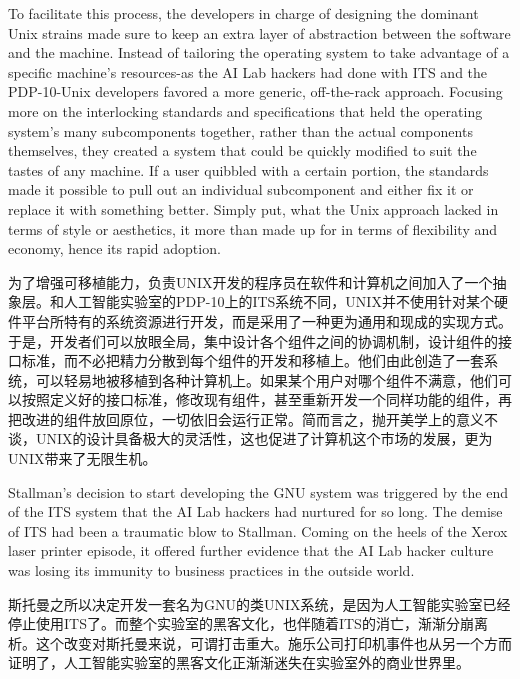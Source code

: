 \ifdefined\vone
\ifdefined\eng
To facilitate this process, the developers in charge of designing the dominant Unix strains made sure to keep an extra layer of abstraction between the software and the machine. Instead of tailoring the operating system to take advantage of a specific machine's resources-as the AI Lab hackers had done with ITS and the PDP-10-Unix developers favored a more generic, off-the-rack approach. Focusing more on the interlocking standards and specifications that held the operating system's many subcomponents together, rather than the actual components themselves, they created a system that could be quickly modified to suit the tastes of any machine. If a user quibbled with a certain portion, the standards made it possible to pull out an individual subcomponent and either fix it or replace it with something better. Simply put, what the Unix approach lacked in terms of style or aesthetics, it more than made up for in terms of flexibility and economy, hence its rapid adoption.
\fi

\ifdefined\chs
为了增强可移植能力，负责UNIX开发的程序员在软件和计算机之间加入了一个抽象层。和人工智能实验室的PDP-10上的ITS系统不同，UNIX并不使用针对某个硬件平台所特有的系统资源进行开发，而是采用了一种更为通用和现成的实现方式。于是，开发者们可以放眼全局，集中设计各个组件之间的协调机制，设计组件的接口标准，而不必把精力分散到每个组件的开发和移植上。他们由此创造了一套系统，可以轻易地被移植到各种计算机上。如果某个用户对哪个组件不满意，他们可以按照定义好的接口标准，修改现有组件，甚至重新开发一个同样功能的组件，再把改进的组件放回原位，一切依旧会运行正常。简而言之，抛开美学上的意义不谈，UNIX的设计具备极大的灵活性，这也促进了计算机这个市场的发展，更为UNIX带来了无限生机。
\fi

\ifdefined\eng
Stallman's decision to start developing the GNU system was triggered by the end of the ITS system that the AI Lab hackers had nurtured for so long. The demise of ITS had been a traumatic blow to Stallman. Coming on the heels of the Xerox laser printer episode, it offered further evidence that the AI Lab hacker culture was losing its immunity to business practices in the outside world.
\fi

\ifdefined\chs
斯托曼之所以决定开发一套名为GNU的类UNIX系统，是因为人工智能实验室已经停止使用ITS了。而整个实验室的黑客文化，也伴随着ITS的消亡，渐渐分崩离析。这个改变对斯托曼来说，可谓打击重大。施乐公司打印机事件也从另一个方而证明了，人工智能实验室的黑客文化正渐渐迷失在实验室外的商业世界里。
\fi

